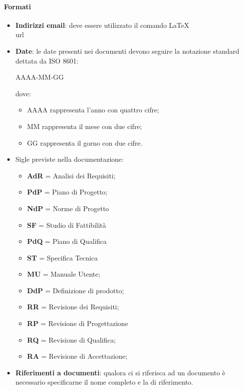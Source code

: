 \paragraph*{Formati}
\begin{itemize}
\item \textbf{Indirizzi email}: deve essere utilizzato il comando \LaTeX \\url
\item \textbf{Date}: le date presenti nei documenti devono seguire la notazione standard dettata da ISO 8601:

  \begin{center}
    AAAA-MM-GG
  \end{center}
  
  dove:
  \begin{itemize}
  \item AAAA rappresenta l'anno con quattro cifre;
  \item MM rappresenta il mese con due cifre;
  \item GG rappresenta il gorno con due cifre.
  \end{itemize}
\item Sigle previste nella documentazione:
  \begin{itemize}
  \item \textbf{AdR} = Analisi dei Requisiti;
  \item \textbf{PdP} = Piano di Progetto;
  \item \textbf{NdP} = Norme di Progetto
  \item \textbf{SF} = Studio di Fattibilità
  \item \textbf{PdQ} = Piano di Qualifica
  \item \textbf{ST} = Specifica Tecnica
  \item \textbf{MU} = Manuale Utente;
  \item \textbf{DdP} = Definizione di prodotto;
  \item \textbf{RR} = Revisione dei Requisiti;
  \item \textbf{RP} = Revisione di Progettazione
  \item \textbf{RQ} = Revisione di Qualifica;
  \item \textbf{RA} = Revisione di Accettazione;
  \end{itemize}
\item \textbf{Riferimenti a documenti}: qualora ci si riferisca ad un documento è necessario specificarne il nome completo e la  di riferimento.
\end{itemize}

